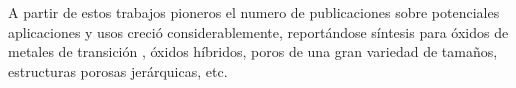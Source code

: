     A partir de estos trabajos pioneros el numero de publicaciones sobre potenciales aplicaciones y usos creció considerablemente, reportándose síntesis para óxidos de metales de transición \cite{Ciesla1996,Ulagappan1996,Antonelli1995}, óxidos híbridos, poros de una gran variedad de tamaños, estructuras porosas jerárquicas, etc.\cite{Soler-Illia2006,Moller1998} %

   






				



